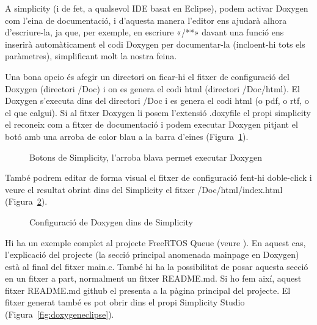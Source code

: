 A simplicity (i de fet, a qualsevol IDE basat en Eclipse), podem activar Doxygen com l'eina de documentació, i d'aquesta manera l'editor ens ajudarà alhora d'escriure-la, ja que, per exemple, en escriure «/**» davant una funció ens inserirà automàticament el codi Doxygen per documentar-la (incloent-hi tots els paràmetres), simplificant molt la nostra feina.

Una bona opcio és afegir un directori on ficar-hi el fitxer de configuració del Doxygen (directori /Doc) i on es genera el codi html (directori /Doc/html). El Doxygen s'executa dins del directori /Doc i es genera el codi html (o pdf, o rtf, o el que calgui). Si al fitxer Doxygen li posem l'extensió .doxyfile el propi simplicity el reconeix com a fitxer de documentació i podem executar Doxygen pitjant el botó amb una arroba de color blau a la barra d'eines (Figura~\ref{fig:doxygenbutton}).

\begin{figure}[h!]
 \centering
 \caption{Botons de Simplicity, l'arroba blava permet executar Doxygen}
 \label{fig:doxygenbutton}
\end{figure}


També podrem editar de forma visual el fitxer de configuració fent-hi doble-click i veure el resultat obrint dins del Simplicity el fitxer /Doc/html/index.html (Figura~\ref{fig:doxygenconfig}).

\begin{figure}
 \centering
 \caption{Configuració de Doxygen dins de Simplicity}
 \label{fig:doxygenconfig}
\end{figure}

Hi ha un exemple complet al projecte FreeRTOS Queue (veure ). En aquest cas, l'explicació del projecte (la secció principal anomenada mainpage en Doxygen) està al final del fitxer main.c. També hi ha la possibilitat de posar aquesta secció en un fitxer a part, normalment un fitxer README.md. Si ho fem així, aquest fitxer README.md github el presenta a la pàgina principal del projecte. El fitxer generat també es pot obrir dins el propi Simplicity Studio (Figura~\ref{fig:doxygeneclipse}).

